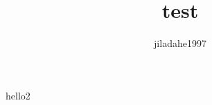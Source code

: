 \documentclass[]{article}
\author{jiladahe1997}
\title{test}
\begin{document}
  hello2
\end{document}
